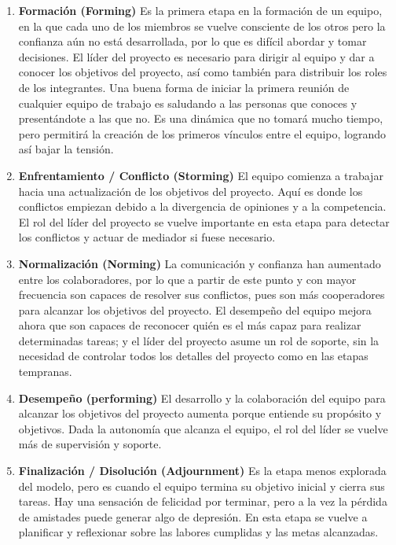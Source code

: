 \begin{enumerate}
    \item \textbf{Formación (Forming)}
    Es la primera etapa en la formación de un equipo, en la que cada uno
    de los miembros se vuelve consciente de los otros pero la confianza
    aún no está desarrollada, por lo que es difícil abordar y tomar
    decisiones. El líder del proyecto es necesario para dirigir al
    equipo y dar a conocer los objetivos del proyecto, así como también
    para distribuir los roles de los integrantes. Una buena forma de
    iniciar la primera reunión de cualquier equipo de trabajo es
    saludando a las personas que conoces y presentándote a las que no.
    Es una dinámica que no tomará mucho tiempo, pero permitirá la
    creación de los primeros vínculos entre el equipo, logrando así
    bajar la tensión.

    \item \textbf{Enfrentamiento / Conflicto (Storming)}
    El equipo comienza a trabajar hacia una actualización de los objetivos
    del proyecto. Aquí es donde los conflictos empiezan debido a la
    divergencia de opiniones y a la competencia. El rol del líder del
    proyecto se vuelve importante en esta etapa para detectar los
    conflictos y actuar de mediador si fuese necesario.

    \item \textbf{Normalización (Norming)}
    La comunicación y confianza han aumentado entre los colaboradores,
    por lo que a partir de este punto y con mayor frecuencia son
    capaces de resolver sus conflictos, pues son más cooperadores para
    alcanzar los objetivos del proyecto. El desempeño del equipo mejora
    ahora que son capaces de reconocer quién es el más capaz para realizar
    determinadas tareas; y el líder del proyecto asume un rol de soporte,
    sin la necesidad de controlar todos los detalles del proyecto como en
    las etapas tempranas.

    \item \textbf{Desempeño (performing)}
    El desarrollo y la colaboración del equipo para alcanzar los
    objetivos del proyecto aumenta porque entiende su propósito y
    objetivos. Dada la autonomía que alcanza el equipo, el rol del líder
    se vuelve más de supervisión y soporte.

    \item \textbf{Finalización / Disolución (Adjournment)}
    Es la etapa menos explorada del modelo, pero es cuando el equipo
    termina su objetivo inicial y cierra sus tareas. Hay una sensación
    de felicidad por terminar, pero a la vez la pérdida de amistades
    puede generar algo de depresión. En esta etapa se vuelve a planificar
    y reflexionar sobre las labores cumplidas y las metas alcanzadas.
\end{enumerate}

